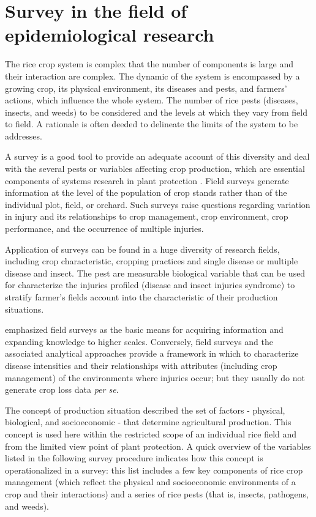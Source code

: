 \documentclass[12pt, oneside]{report}
\begin{document}
\section*{Survey in the field of epidemiological research}

The rice crop system is complex that the number of components is large and their interaction are complex. The dynamic of the system is encompassed by a growing crop, its physical environment, its diseases and pests, and farmers' actions, which influence the whole system. The number of rice pests (diseases, insects, and weeds) to be considered and the levels at which they vary from field to field. A rationale is often deeded to delineate the limits of the system to be addresses.

A survey is a good tool to provide an adequate account of this diversity and deal with the several pests or variables affecting crop production, which are essential components of systems research in plant protection \citet{Zadoks:1979ts}. Field surveys generate information at the level of the population of crop stands rather than of the individual plot, field, or orchard. Such surveys raise questions regarding variation in injury and its relationships to crop management, crop environment, crop performance, and the occurrence of multiple injuries.

Application of surveys can be found in a huge diversity of research fields, including crop characteristic, cropping practices and single disease or multiple disease and insect. The pest are measurable biological variable that can be used for characterize the injuries profiled (disease and insect injuries syndrome) to stratify farmer's fields account into the characteristic of their production situations.

\cite{savary1995use} emphasized field surveys as the basic means for acquiring information and expanding knowledge to higher scales. Conversely, field surveys and the associated analytical approaches provide a framework in which to characterize disease intensities and their relationships with attributes (including crop management) of the environments where injuries occur; but they usually do not generate crop loss data \textit{per se}.

The concept of production situation described the set of factors - physical, biological, and socioeconomic - that determine agricultural production. This concept is used here within the restricted scope of an individual rice field and from the limited view point of plant protection. A quick overview of the variables listed in the following survey procedure indicates how this concept is operationalized in a survey: this list includes a few key components of rice crop management (which reflect the physical and socioeconomic environments of a crop and their interactions) and a series of rice pests (that is, insects, pathogens, and weeds).
\end{document}
